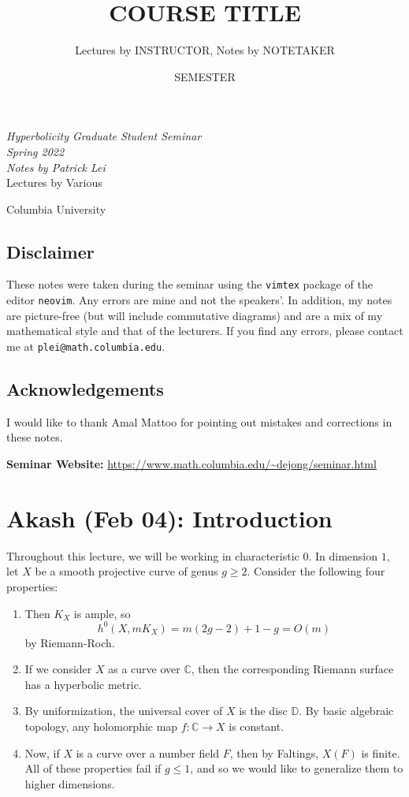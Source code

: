 \documentclass[leqno, openany]{memoir}
\title{COURSE TITLE}
\author{Lectures by INSTRUCTOR, Notes by NOTETAKER}
\date{SEMESTER}
\theoremstyle{definition}
\theoremstyle{remark}
\theoremstyle{plain}
\theoremstyle{definition}
\theoremstyle{remark}
\newcommand{\C}{\mathbb{C}}
\newcommand*{\titleSW}
    {\begingroup%
    \raggedleft
    \vspace*{\baselineskip}
    {\Huge\itshape Hyperbolicity Graduate Student Seminar \\ Spring 2022}\\[\baselineskip]
    {\large\itshape Notes by Patrick Lei}\\[0.2\textheight]
    {\Large Lectures by Various}\par
    \vfill
    {\Large \sffamily Columbia University}
    \vspace*{\baselineskip}
\endgroup}
\begin{document}
    
\begin{titlingpage}
\titleSW
\end{titlingpage}

\thispagestyle{empty}
\section*{Disclaimer}%
\label{sec:disclaimer}

These notes were taken during the seminar using the \texttt{vimtex} package of the editor \texttt{neovim}. 
Any errors are mine and not the speakers'. 
In addition, my notes are picture-free (but will include commutative diagrams) and are a mix of my mathematical style and that of the lecturers.
If you find any errors, please contact me at \texttt{plei@math.columbia.edu}.

\section*{Acknowledgements}
I would like to thank Amal Mattoo for pointing out mistakes and corrections in these notes.

\vspace*{1cm}

\noindent\textbf{Seminar Website:}  \url{https://www.math.columbia.edu/~dejong/seminar.html}
\newpage

\tableofcontents

\chapter{Akash (Feb 04): Introduction}%

Throughout this lecture, we will be working in characteristic 0. In dimension $1$, let $X$ be a smooth projective curve of genus $g \geq 2$. Consider the following four properties: 
\begin{enumerate}[(1)]
    \item Then $K_X$ is ample, so 
    \[ h^0 (X, m K_X) = m (2g-2) + 1-g = O(m) \]
    by Riemann-Roch. 
    \item If we consider $X$ as a curve over $\C$, then the corresponding Riemann surface has a hyperbolic metric. 
    \item By uniformization, the universal cover of $X$ is the disc $\mathbb{D}$. By basic algebraic topology, any holomorphic map $f \colon \C \to X$ is constant. 
    \item Now, if $X$ is a curve over a number field $F$, then by Faltings, $X(F)$ is finite. All of these properties fail if $g \leq 1$, and so we would like to generalize them to higher dimensions.
\end{enumerate}
\end{document}
